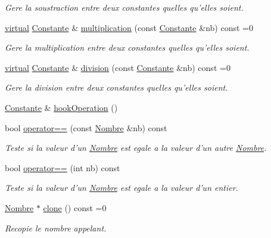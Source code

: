 \begin{DoxyCompactItemize}
\begin{DoxyCompactList}\small\item\em \-Gere la soustraction entre deux constantes quelles qu'elles soient. \end{DoxyCompactList}\item 
\hyperlink{classvirtual}{virtual} \hyperlink{class_l_o21_1_1_constante}{\-Constante} \& \hyperlink{class_l_o21_1_1_nombre_a63cf8dbd304585fe106e8eeebe8c4e89}{multiplication} (const \hyperlink{class_l_o21_1_1_constante}{\-Constante} \&nb) const =0
\begin{DoxyCompactList}\small\item\em \-Gere la multiplication entre deux constantes quelles qu'elles soient. \end{DoxyCompactList}\item 
\hyperlink{classvirtual}{virtual} \hyperlink{class_l_o21_1_1_constante}{\-Constante} \& \hyperlink{class_l_o21_1_1_nombre_aafde3453c22512a8ca152f4013d0f08f}{division} (const \hyperlink{class_l_o21_1_1_constante}{\-Constante} \&nb) const =0
\begin{DoxyCompactList}\small\item\em \-Gere la division entre deux constantes quelles qu'elles soient. \end{DoxyCompactList}\item 
\hyperlink{class_l_o21_1_1_constante}{\-Constante} \& \hyperlink{class_l_o21_1_1_nombre_a27247b37ee0159071efbd64bc73d852c}{hook\-Operation} ()
\item 
bool \hyperlink{class_l_o21_1_1_nombre_a13d1275bac5b339723ee7b033461c9a4}{operator==} (const \hyperlink{class_l_o21_1_1_nombre}{\-Nombre} \&nb) const 
\begin{DoxyCompactList}\small\item\em \-Teste si la valeur d'un \hyperlink{class_l_o21_1_1_nombre}{\-Nombre} est egale a la valeur d'un autre \hyperlink{class_l_o21_1_1_nombre}{\-Nombre}. \end{DoxyCompactList}\item 
bool \hyperlink{class_l_o21_1_1_nombre_ab0d95d7d706e176ee9121feecacf3be7}{operator==} (int nb) const 
\begin{DoxyCompactList}\small\item\em \-Teste si la valeur d'un \hyperlink{class_l_o21_1_1_nombre}{\-Nombre} est egale a la valeur d'un entier. \end{DoxyCompactList}\item 
\hyperlink{class_l_o21_1_1_nombre}{\-Nombre} $\ast$ \hyperlink{class_l_o21_1_1_nombre_aea071e3bcebfdc9337eaea8515e248c9}{clone} () const =0
\begin{DoxyCompactList}\small\item\em \-Recopie le nombre appelant. \end{DoxyCompactList}\end{DoxyCompactItemize}


